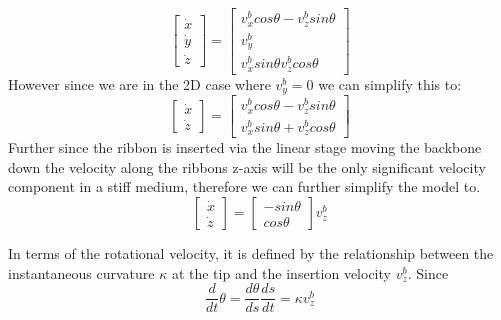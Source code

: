 \begin{equation}
    \begin{bmatrix}
        \dot{x}\\ \dot{y}\\ \dot{z}
    \end{bmatrix} = \begin{bmatrix}
        v_x^bcos \theta - v_z^b sin \theta\\
        v_y^b\\
        v_x^b sin \theta  v_z^b cos \theta
    \end{bmatrix}
\end{equation}
However since we are in the 2D case where \(v_y^b = 0\) we can simplify this to:
\begin{equation}
        \begin{bmatrix}
        \dot{x}\\ \dot{z}
    \end{bmatrix} = \begin{bmatrix}
        v_x^bcos \theta - v_z^b sin \theta\\
        v_x^b sin \theta + v_z^b cos \theta
    \end{bmatrix}
\end{equation}
Further since the ribbon is inserted via the linear stage moving the backbone down the velocity along the ribbons z-axis will be the only significant velocity component in a stiff medium, therefore we can further simplify the model to.
\begin{equation}
	\begin{bmatrix}
	\dot{x} \\ \dot{z}
	\end{bmatrix} = \begin{bmatrix}
	-sin\theta \\ cos\theta
	\end{bmatrix} v_z^b
\end{equation}

In terms of the rotational velocity, it is defined by the relationship between the instantaneous curvature $\kappa$ at the tip and the insertion velocity $v_z^b$. Since 
\begin{equation}
    \frac{d}{dt}\theta  = \frac{d\theta}{ds}\frac{ds}{dt}=\kappa v_z^b
\end{equation}


